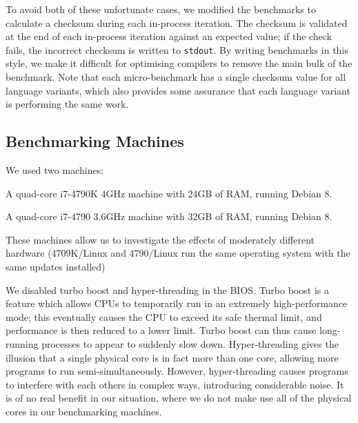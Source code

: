\documentclass[a4paper,UKenglish]{lipics}
\newcommand{\hyptwo}{H2\xspace}
\newcommand{\bencherthree}{4709K/Linux\xspace}
\newcommand{\bencherfive}{4790/Linux\xspace}
\newcommand{\benchersix}{4790/OpenBSD\xspace}
\begin{document}
To avoid both of these unfortunate cases,
we modified the benchmarks to calculate a checksum during each in-process iteration.
The checksum is validated at the end of each in-process iteration against an expected
value; if the check fails, the incorrect checksum is written to \texttt{stdout}.
By writing benchmarks in
this style, we make it difficult for optimising compilers to remove the
main bulk of the benchmark. Note that each micro-benchmark has a single checksum value for all
language variants, which also provides some assurance that each language variant is
performing the same work.


\subsection{Benchmarking Machines}

We used two machines:
\begin{description*}
  \item[\bencherthree] A quad-core i7-4790K 4GHz machine with 24GB of RAM, running Debian 8.
  \item[\bencherfive] A quad-core i7-4790 3.6GHz machine with 32GB of RAM, running Debian 8.
\end{description*}
These machines allow us to investigate the effects of moderately different
hardware (\bencherthree and \bencherfive run the same operating system with the
same updates installed)

We disabled turbo boost and hyper-threading in the BIOS. Turbo boost is a
feature which allows CPUs to temporarily run in an extremely high-performance
mode; this eventually causes the CPU to exceed its safe thermal limit, and
performance is then reduced to a lower limit. Turbo boost can thus cause long-running processes to
appear to suddenly slow down. Hyper-threading gives the illusion that a single
physical core is in fact more than one core, allowing more programs to
run semi-simultaneously. However, hyper-threading causes programs to interfere
with each others in complex ways, introducing considerable noise. It
is of no real benefit in our situation, where we do not make use all of the
physical cores in our benchmarking machines.
\end{document}
